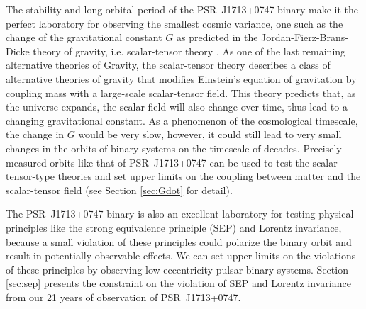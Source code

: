 The stability and long orbital period of the PSR~J1713+0747 binary make it the
perfect laboratory for observing the smallest cosmic variance, one such as the
change of the gravitational constant $G$ as predicted in the Jordan-Fierz-Brans-Dicke
theory of gravity, i.e. scalar-tensor theory \citep{jor59,fie56,bd61}. 
As one of the last remaining alternative theories of Gravity, the
scalar-tensor theory describes a class of alternative theories of gravity
that modifies Einstein's equation of gravitation by coupling mass with a large-scale scalar-tensor field.
This theory predicts that, as the universe expands, the scalar field will
also change over time, thus lead to a changing gravitational constant. 
As a phenomenon of the cosmological timescale, the change in $G$ would be very slow, however, it could still lead to very small
changes in the orbits of binary systems on the timescale of decades. 
Precisely measured orbits like that of PSR~J1713+0747 can be used to test the scalar-tensor-type theories and set upper limits on the coupling between matter and the scalar-tensor field (see Section \ref{sec:Gdot} for detail). 

The PSR~J1713+0747 binary is also an excellent laboratory for testing physical 
principles like the strong equivalence principle (SEP) and Lorentz invariance,
because a small violation of these principles could polarize the
binary orbit and result in potentially observable effects. We can set
upper limits on the violations of these principles by observing
low-eccentricity pulsar binary systems. Section \ref{sec:sep} presents the
constraint on the violation of SEP and Lorentz invariance from our 21 years of observation of PSR~J1713+0747.

